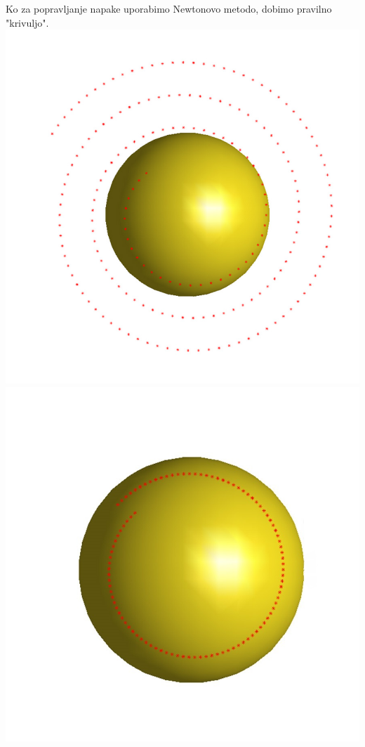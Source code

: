 \documentclass[]{article}
\begin{document}
	Ko za popravljanje napake uporabimo Newtonovo metodo, dobimo pravilno "krivuljo".\\
	\includegraphics[scale=0.2]{eul2}
	\includegraphics[scale=0.2]{eul1}
\end{document}
